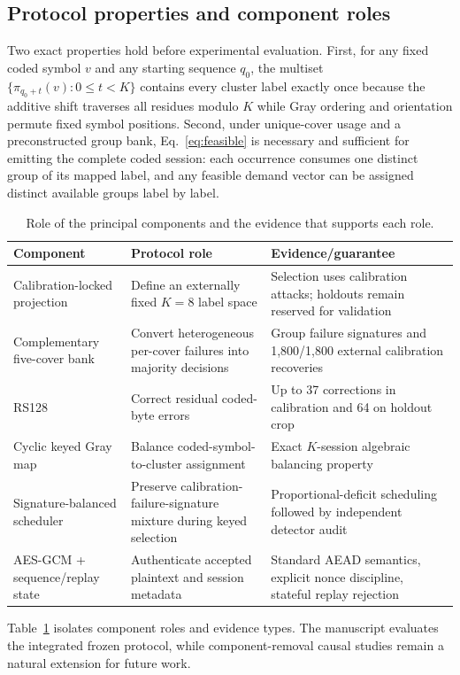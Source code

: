 \subsection{Protocol properties and component roles}

Two exact properties hold before experimental evaluation. First, for any fixed coded symbol $v$ and any starting sequence $q_0$, the multiset $\{\pi_{q_0+t}(v):0\le t<K\}$ contains every cluster label exactly once because the additive shift traverses all residues modulo $K$ while Gray ordering and orientation permute fixed symbol positions. Second, under unique-cover usage and a preconstructed group bank, Eq.~\eqref{eq:feasible} is necessary and sufficient for emitting the complete coded session: each occurrence consumes one distinct group of its mapped label, and any feasible demand vector can be assigned distinct available groups label by label.

\begin{table}[t]
\caption{Role of the principal components and the evidence that supports each role.}
\label{tab:roles}
\small
\begin{tabularx}{\textwidth}{@{}lXX@{}}
\toprule
Component & Protocol role & Evidence/guarantee \\
\midrule
Calibration-locked projection & Define an externally fixed $K=8$ label space & Selection uses calibration attacks; holdouts remain reserved for validation \\
Complementary five-cover bank & Convert heterogeneous per-cover failures into majority decisions & Group failure signatures and 1,800/1,800 external calibration recoveries \\
RS128 & Correct residual coded-byte errors & Up to 37 corrections in calibration and 64 on holdout crop \\
Cyclic keyed Gray map & Balance coded-symbol-to-cluster assignment & Exact $K$-session algebraic balancing property \\
Signature-balanced scheduler & Preserve calibration-failure-signature mixture during keyed selection & Proportional-deficit scheduling followed by independent detector audit \\
AES-GCM + sequence/replay state & Authenticate accepted plaintext and session metadata & Standard AEAD semantics, explicit nonce discipline, stateful replay rejection \\
\bottomrule
\end{tabularx}
\end{table}

Table~\ref{tab:roles} isolates component roles and evidence types. The manuscript evaluates the integrated frozen protocol, while component-removal causal studies remain a natural extension for future work.
